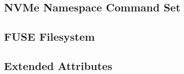 \subsection{NVMe Namespace Command Set}

\subsection{FUSE Filesystem}

\subsection{Extended Attributes}

